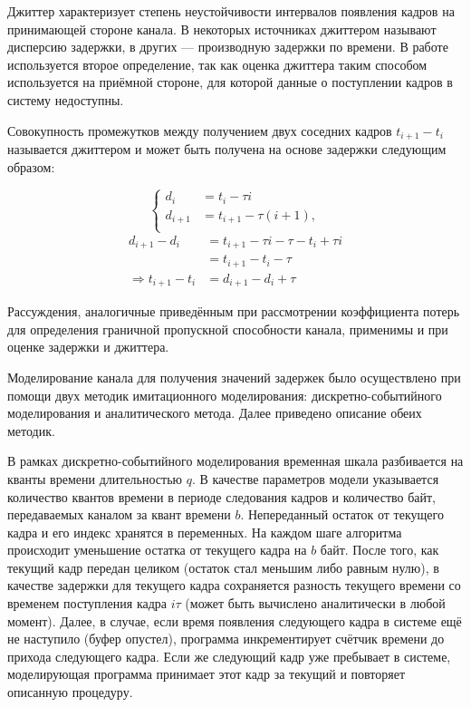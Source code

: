 Джиттер характеризует степень неустойчивости интервалов появления
кадров на принимающей стороне канала. В некоторых источниках
\cite{}
джиттером называют дисперсию задержки, в других
\cite{}
--- производную задержки по времени. В работе используется
второе определение, так как оценка джиттера таким способом
используется на приёмной стороне, для которой данные о поступлении
кадров в систему недоступны.

Совокупность промежутков между получением двух соседних кадров $t_{i+1} - t_i$
называется джиттером и может быть получена на основе задержки следующим образом:

\begin{equation}
    \left\{
    \begin{aligned}
        d_i &= t_i - \tau i\\
        d_{i+1} &= t_{i+1} - \tau (i+1),\\
    \end{aligned}
    \right.
\end{equation}
\begin{equation}
    \begin{aligned}
    d_{i+1} - d_i &= t_{i+1} - \tau i - \tau - t_i + \tau i\\
                  &= t_{i+1} - t_i - \tau\\
    \Longrightarrow t_{i+1} - t_i &= d_{i+1} - d_i + \tau
    \end{aligned}
\end{equation}

Рассуждения, аналогичные приведённым при рассмотрении коэффициента
потерь для определения граничной пропускной способности канала,
применимы и при оценке задержки и джиттера.

Моделирование канала для получения значений задержек было
осуществлено при помощи двух методик имитационного моделирования:
дискретно-событийного моделирования и аналитического метода.
Далее приведено описание обеих методик.

В рамках дискретно-событийного моделирования временная шкала
разбивается на кванты времени длительностью $q$. В качестве 
параметров модели указывается количество квантов времени в
периоде следования кадров и количество байт, передаваемых
каналом за квант времени $b$. Непереданный остаток от текущего
кадра и его индекс хранятся в переменных. На каждом шаге
алгоритма происходит уменьшение остатка от текущего кадра
на $b$ байт. После того, как текущий кадр передан целиком
(остаток стал меньшим либо равным нулю), в качестве задержки
для текущего кадра сохраняется разность текущего времени со
временем поступления кадра $i \tau$ (может быть вычислено аналитически в любой момент).
Далее, в случае, если время появления следующего кадра в системе
ещё не наступило (буфер опустел), программа инкрементирует
счётчик времени до прихода следующего кадра. Если же следующий
кадр уже пребывает в системе, моделирующая программа принимает
этот кадр за текущий и повторяет описанную процедуру.


